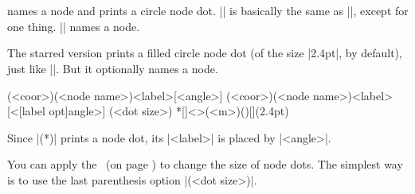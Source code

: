 \begin{tzcode}{.3}
\end{tzcode}


\section{\protect\cmd{\tznodedot(*)}}
\label{s:tznodedot}

\icmd{\tznodedot} names a node and prints a circle node dot.
|\tznodedot| is basically the same as |\tzdot|, except for one thing.
|\tznodedot| names a node.

The starred version \icmd{\tznodedot*} prints a filled circle node dot (of the size |2.4pt|, by default), just like |\tzdot*|. But it optionally names a node.

\begin{tzdef}{}
\tznodedot(<coor>)(<node name>){<label>}[<angle>]
           (<coor>)(<node name>){<label>}[<[label opt]angle>] (<dot size>)
 *[]<>(<m>)(){}[](2.4pt)
\end{tzdef}

Since |\tznodedot(*)| prints a node dot, its |<label>| is placed by |<angle>|.

\begin{tzcode}{.3}
\end{tzcode}

You can apply the \threeways\ (on page \pageref{ss:threeways}) to change the size of node dots.
The simplest way is to use the last parenthesis option |(<dot size>)|.

\begin{tzcode}{.3}
\end{tzcode}


